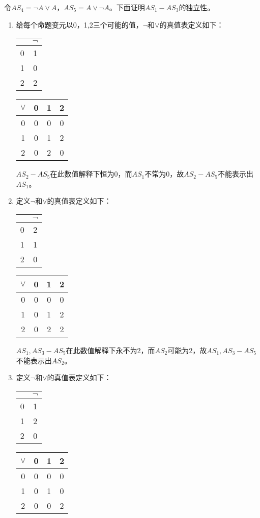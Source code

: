 \documentclass[a4paper]{ctexart}
\begin{document}
令$AS_4=\neg A\vee A$，$AS_5=A\vee\neg A$。下面证明$AS_1-AS_3$的独立性。
\begin{enumerate}
  \item 给每个命题变元以0，1,2三个可能的值，$\neg$和$\vee$的真值表定义如下：
  \begin{table}[!hbp]
    \begin{tabular}{c|c}
      & $\neg$ \\
      \hline
      0 & 1 \\
      1 & 0 \\
      2 & 2
    \end{tabular}
    \hfil
    \begin{tabular}{c|ccc}
      $\vee$ & 0 & 1 & 2 \\
      \hline
      0 & 0 & 0 & 0 \\
      1 & 0 & 1 & 2 \\
      2 & 0 & 2 & 0 \\
    \end{tabular}    
  \end{table}
  
  $AS_2-AS_5$在此数值解释下恒为0，而$AS_1$不常为0，故$AS_2-AS_5$不能表示出$AS_1$。
  \item 定义$\neg$和$\vee$的真值表定义如下：
  \begin{table}[!hbp]
    \begin{tabular}{c|c}
      & $\neg$ \\
      \hline
      0 & 2 \\
      1 & 1 \\
      2 & 0
    \end{tabular}
    \hfil
    \begin{tabular}{c|ccc}
      $\vee$ & 0 & 1 & 2 \\
      \hline
      0 & 0 & 0 & 0 \\
      1 & 0 & 1 & 2 \\
      2 & 0 & 2 & 2 \\
    \end{tabular}    
  \end{table}
  
  $AS_1,AS_3-AS_5$在此数值解释下永不为2，而$AS_2$可能为2，故$AS_1,AS_3-AS_5$不能表示出$AS_2$。
  \item 定义$\neg$和$\vee$的真值表定义如下：
  \begin{table}[!hbp]
    \begin{tabular}{c|c}
      & $\neg$ \\
      \hline
      0 & 1 \\
      1 & 2 \\
      2 & 0
    \end{tabular}
    \hfil
    \begin{tabular}{c|ccc}
      $\vee$ & 0 & 1 & 2 \\
      \hline
      0 & 0 & 0 & 0 \\
      1 & 0 & 1 & 0 \\
      2 & 0 & 0 & 2 \\
    \end{tabular}    
  \end{table}
  

\end{enumerate}
\end{document}
